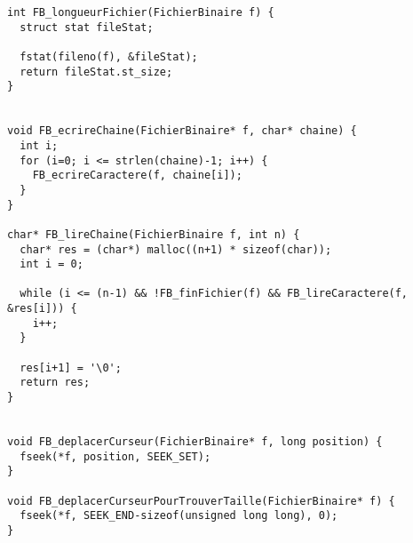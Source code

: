 \begin{verbatim}
int FB_longueurFichier(FichierBinaire f) {
  struct stat fileStat;

  fstat(fileno(f), &fileStat);
  return fileStat.st_size;
}


void FB_ecrireChaine(FichierBinaire* f, char* chaine) {
  int i;
  for (i=0; i <= strlen(chaine)-1; i++) {
    FB_ecrireCaractere(f, chaine[i]);
  }
}

char* FB_lireChaine(FichierBinaire f, int n) {
  char* res = (char*) malloc((n+1) * sizeof(char));
  int i = 0;

  while (i <= (n-1) && !FB_finFichier(f) && FB_lireCaractere(f, &res[i])) {
    i++;
  }

  res[i+1] = '\0';
  return res;
}


void FB_deplacerCurseur(FichierBinaire* f, long position) {
  fseek(*f, position, SEEK_SET);
}

void FB_deplacerCurseurPourTrouverTaille(FichierBinaire* f) {
  fseek(*f, SEEK_END-sizeof(unsigned long long), 0);
}


\end{verbatim}
 
